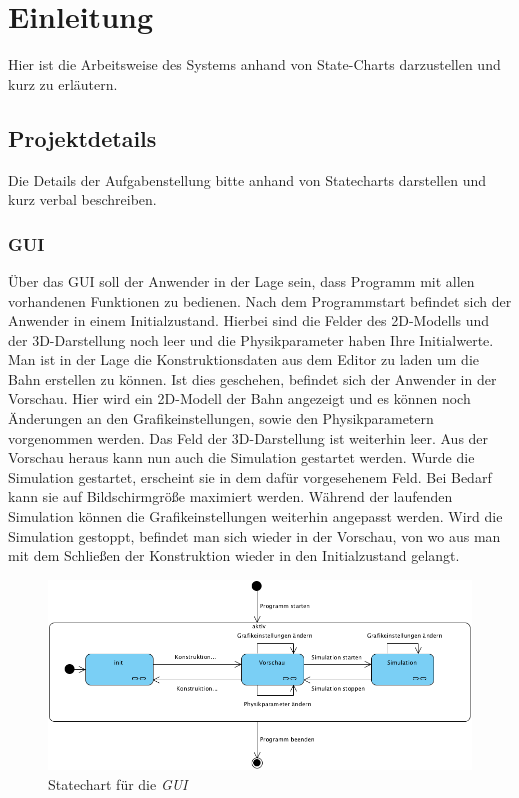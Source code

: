 
\chapter{Einleitung}
Hier ist die Arbeitsweise des Systems anhand von State-Charts darzustellen und
kurz zu erläutern.
\section{Projektdetails}
Die Details der Aufgabenstellung bitte anhand von Statecharts darstellen und
kurz verbal beschreiben.

\subsection{GUI}
Über das GUI soll der Anwender in der Lage sein, dass Programm mit allen vorhandenen Funktionen zu bedienen.
Nach dem Programmstart befindet sich der Anwender in einem Initialzustand. Hierbei sind die Felder des 2D-Modells und der 3D-Darstellung noch leer und die Physikparameter haben Ihre Initialwerte. Man ist in der Lage die Konstruktionsdaten aus dem Editor zu laden um die Bahn erstellen zu können.
Ist dies geschehen, befindet sich der Anwender in der Vorschau. Hier wird ein 2D-Modell der Bahn angezeigt und es können noch Änderungen an den Grafikeinstellungen, sowie den Physikparametern vorgenommen werden. Das Feld der 3D-Darstellung ist weiterhin leer. Aus der Vorschau heraus kann nun auch die Simulation gestartet werden.
Wurde die Simulation gestartet, erscheint sie in dem dafür vorgesehenem Feld. Bei Bedarf kann sie auf Bildschirmgröße maximiert werden. Während der laufenden Simulation können die Grafikeinstellungen weiterhin angepasst werden.
Wird die Simulation gestoppt, befindet man sich wieder in der Vorschau, von wo aus man mit dem Schließen der Konstruktion wieder in den Initialzustand gelangt.

\begin{figure}
\includegraphics[width=\linewidth]{bilder/StateChart_GUI}
\caption{Statechart für die \textit{GUI}}
\end{figure}

